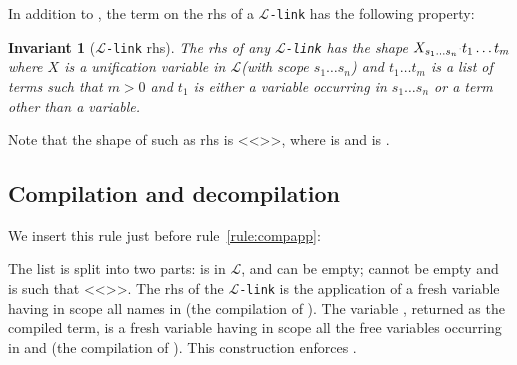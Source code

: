 \documentclass[sigconf,natbib=false,review]{acmart}
\newtheorem{invariant}{Invariant}
\newcommand{\appsep}{\ensuremath{\textcolor{lightgray}{\cdot}}}
\newcommand{\llambda}{\ensuremath{\mathcal{L}}\xspace}
\newcommand{\linkMacro}[1]{\ensuremath{#1}\texttt{-link}\xspace}
\newcommand{\linkbeta}{\linkMacro{\llambda}}
\newcommand{\linkbetaM}[3]{\ensuremath{#1 \vdash #2 =_{\llambda} #3}}
\newcommand{\rhs}{rhs\xspace}
\newcommand{\linkStore}{\texorpdfstring{\ensuremath{\mathbb{L}}\xspace}{L}}
\begin{document}
In addition to , the term on the \rhs of a \linkbeta
has the following property:

\newcommand{\rhsBetaHead}{\ensuremath{X_{s_1\dots s_n}}}
\newcommand{\rhsBeta}{\ensuremath{\rhsBetaHead\appsep t_1\dots t_m}\xspace}

\begin{invariant}[\linkbeta \rhs]
  The \rhs of any \linkbeta has the shape $X_{s_1\ldots s_n}\appsep t_1\dots t_m$
  where $X$ is a unification variable in \llambda (with scope $s_1\dots s_n$)
  and $t_1\dots t_m$ is a list of terms such that $m>0$ and
  $t_1$ is either a variable occurring in $s_1\dots s_n$ or
  a term other than a variable.
  \label{inv:beta-rhs}
\end{invariant}

\noindent Note that the shape of such as \rhs is
  <<>>, where
   is \elpiIn{[s~$_1$~, ~$\ldots$~, s~$_n$~]}
  and  is  \elpiIn{[t~$_1$~, ~$\ldots$~, t~$_m$~]}.
  




\subsection{Compilation and decompilation}

We insert this rule
just before rule~\ref{rule:compapp}:



\noindent
The list  is split into two parts: 
 is in \llambda, and can be empty; 
 cannot be empty and is such that
<<>>.
The \rhs of the \linkbeta is
the application of a fresh variable  having
in scope all names in  (the compilation of ).
The variable , returned as the compiled term, is a fresh variable
having in scope all the free variables occurring in  and
 (the compilation of ).
This construction enforces .
\end{document}
